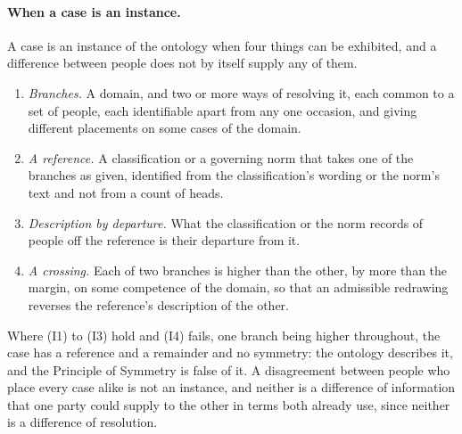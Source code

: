\paragraph{When a case is an instance.} A case is an instance of the ontology when four things can be exhibited, and a difference between people does not by itself supply any of them.
\begin{enumerate}[label=(I\arabic*), leftmargin=*, nosep]
\item \emph{Branches.} A domain, and two or more ways of resolving it, each common to a set of people, each identifiable apart from any one occasion, and giving different placements on some cases of the domain.
\item \emph{A reference.} A classification or a governing norm that takes one of the branches as given, identified from the classification's wording or the norm's text and not from a count of heads.
\item \emph{Description by departure.} What the classification or the norm records of people off the reference is their departure from it.
\item \emph{A crossing.} Each of two branches is higher than the other, by more than the margin, on some competence of the domain, so that an admissible redrawing reverses the reference's description of the other.
\end{enumerate}
Where (I1) to (I3) hold and (I4) fails, one branch being higher throughout, the case has a reference and a remainder and no symmetry: the ontology describes it, and the Principle of Symmetry is false of it. A disagreement between people who place every case alike is not an instance, and neither is a difference of information that one party could supply to the other in terms both already use, since neither is a difference of resolution.

